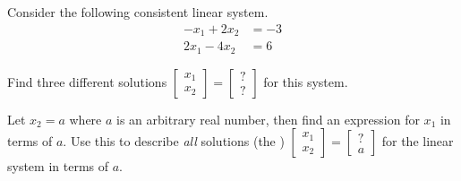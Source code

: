 \begin{applicationActivities}{1}{3}
\begin{activity}{10}
  Consider the following consistent linear system.
  \begin{align*}
  -x_1+2x_2  &= -3 \\
  2x_1-4x_2  &=  6
  \end{align*}
\begin{subactivity}
  Find three different solutions
  \(
    \begin{bmatrix}
      x_1 \\
      x_2
    \end{bmatrix}=
    \begin{bmatrix}
      ? \\
      ?
    \end{bmatrix}
  \)
  for this system.
\end{subactivity}
\begin{subactivity}
  Let \(x_2=a\) where \(a\) is an arbitrary real number, then find an
  expression for \(x_1\) in terms of \(a\). Use this to describe \textit{all}
  solutions (the )
  \(
    \begin{bmatrix}
      x_1 \\
      x_2
    \end{bmatrix}=
    \begin{bmatrix}
      ? \\
      a
    \end{bmatrix}
  \)
  for the linear system in terms of \(a\).
\end{subactivity}
\end{activity}


\end{applicationActivities}
